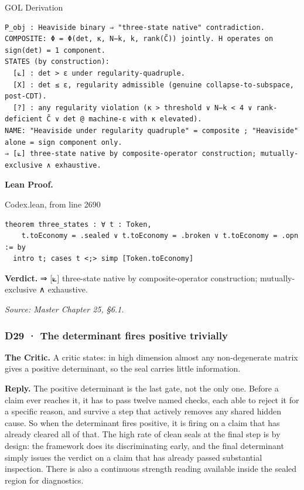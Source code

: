 \documentclass[10pt,twocolumn]{article}
\begin{document}
\begin{golbox}{GOL Derivation}
\begin{lstlisting}[style=golv]
P_obj : Heaviside binary ⇒ "three-state native" contradiction.
COMPOSITE: Φ = Φ(det, κ, N−k, k, rank(C̃)) jointly. H operates on sign(det) = 1 component.
STATES (by construction):
  [⟀] : det > ε under regularity-quadruple.
  [X] : det ≤ ε, regularity admissible (genuine collapse-to-subspace, post-CDT).
  [?] : any regularity violation (κ > threshold ∨ N−k < 4 ∨ rank-deficient C̃ ∨ det @ machine-ε with κ elevated).
NAME: "Heaviside under regularity quadruple" = composite ; "Heaviside" alone = sign component only.
⇒ [⟀] three-state native by composite-operator construction; mutually-exclusive ∧ exhaustive.
\end{lstlisting}
\end{golbox}

\textbf{Lean Proof.}

\begin{leanexcerpt}{Codex.lean, from line 2690}
\begin{lstlisting}[style=leanx,firstnumber=2690]
theorem three_states : ∀ t : Token,
    t.toEconomy = .sealed ∨ t.toEconomy = .broken ∨ t.toEconomy = .opn := by
  intro t; cases t <;> simp [Token.toEconomy]
\end{lstlisting}
\end{leanexcerpt}

\textbf{Verdict.} ⇒ {[}⟀{]} three-state native by composite-operator
construction; mutually-exclusive ∧ exhaustive.

\emph{Source: Master Chapter 25, §6.1.}

\hypertarget{d29-the-determinant-fires-positive-trivially}{%
\subsubsection{D29 · The determinant fires positive
trivially}\label{d29-the-determinant-fires-positive-trivially}}

\textbf{The Critic.} A critic states: in high dimension almost any
non-degenerate matrix gives a positive determinant, so the seal carries
little information.

\textbf{Reply.} The positive determinant is the last gate, not the only
one. Before a claim ever reaches it, it has to pass twelve named checks,
each able to reject it for a specific reason, and survive a step that
actively removes any shared hidden cause. So when the determinant fires
positive, it is firing on a claim that has already cleared all of that.
The high rate of clean seals at the final step is by design: the
framework does its discriminating early, and the final determinant
simply issues the verdict on a claim that has already passed substantial
inspection. There is also a continuous strength reading available inside
the sealed region for diagnostics.
\end{document}

